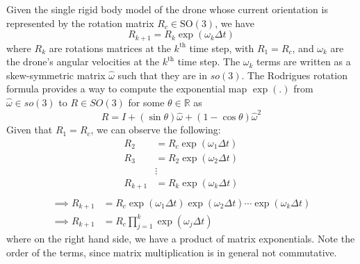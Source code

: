 Given the single rigid body model of the drone whose current orientation is represented by the rotation matrix \( R_c \in \text{SO}(3) \), we have
\begin{equation*}
    R_{k+1}
    =
    R_k \exp(\omega_k \Delta t)
\end{equation*}
where \( R_k \) are rotations matrices at the \( k^{\text{th}} \) time step, with \( R_{1} = R_c \), and \( \omega_k \) are the drone's angular velocities at the \( k^{\text{th}} \) time step.
The \( \omega_k \) terms are written as a skew-symmetric matrix \( \hat\omega \) such that they are in \( so(3) \).
The Rodrigues rotation formula provides a way to compute the exponential map \( \exp(.) \) from \( \hat \omega \in so(3)\) to \( R \in SO(3)\) for some \( \theta \in \mathbb{R} \) as
\[
    R = I +(\sin \theta )\hat\omega +(1-\cos \theta )\hat\omega^2
\]
Given that \( R_{1} = R_c \), we can observe the following:
\begin{align*}
    R_{2}
     & =
    R_{c} \exp(\omega_1 \Delta t)
    \\
    R_{3}
     & =
    R_{2} \exp(\omega_2 \Delta t)
    \\ &
    \vdots
    \\
    R_{k+1}
     & =
    R_{k} \exp(\omega_k \Delta t)
    \\
\end{align*}
\begin{align*}
    \implies
    R_{k+1}
     & =
    R_c \exp(\omega_1 \Delta t) \exp(\omega_2 \Delta t) \cdots \exp(\omega_k \Delta t)
    \\
    \implies
    R_{k+1}
     & =
    R_c \prod_{j=1}^{k} \exp(\omega_j \Delta t)
\end{align*}
where on the right hand side, we have a product of matrix exponentials.
Note the order of the terms, since matrix multiplication is in general not commutative.

